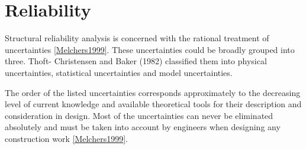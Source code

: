 \documentclass[letterpaper,10pt,english]{sphinxmanual}
\begin{document}
\section{Reliability}
\label{theory:reliability}
Structural reliability analysis is concerned with the rational treatment of
uncertainties {\hyperref[references:melchers1999]{{[}Melchers1999{]}}}. These uncertainties could be broadly grouped
into three. Thoft- Christensen and Baker (1982) classified them into physical
uncertainties, statistical uncertainties and model uncertainties.

The order of the listed uncertainties corresponds approximately to the
decreasing level of current knowledge and available theoretical tools for
their description and consideration in design. Most of the uncertainties can
never be eliminated absolutely and must be taken into account by engineers
when designing any construction work {\hyperref[references:melchers1999]{{[}Melchers1999{]}}}.
\end{document}
